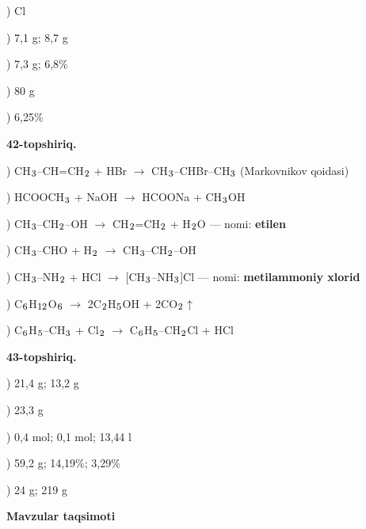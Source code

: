 \documentclass[11pt,a4paper]{article}
\renewcommand{\textsubscript}[1]{\ensuremath{_{\text{\fontsize{8}{8}\selectfont #1}}}}
\begin{document}
) Cl\par
{}) 7,1 g; 8,7 g\par
{}) 7,3 g; 6,8\%\par
{}) 80 g\par
{}) 6,25\%\par
\noindent\textbf{42-topshiriq.}\par
{}) CH\textsubscript{3}--CH=CH\textsubscript{2} + HBr $\to$ CH\textsubscript{3}--CHBr--CH\textsubscript{3} (Markovnikov qoidasi)\par
{}) HCOOCH\textsubscript{3} + NaOH $\to$ HCOONa + CH\textsubscript{3}OH\par
{}) CH\textsubscript{3}--CH\textsubscript{2}--OH $\to$ CH\textsubscript{2}=CH\textsubscript{2} + H\textsubscript{2}O --- nomi: \textbf{etilen}\par
{}) CH\textsubscript{3}--CHO + H\textsubscript{2} $\to$ CH\textsubscript{3}--CH\textsubscript{2}--OH\par
{}) CH\textsubscript{3}--NH\textsubscript{2} + HCl $\to$ [CH\textsubscript{3}--NH\textsubscript{3}]Cl --- nomi: \textbf{metilammoniy xlorid}\par
{}) C\textsubscript{6}H\textsubscript{12}O\textsubscript{6} $\to$ 2C\textsubscript{2}H\textsubscript{5}OH + 2CO\textsubscript{2}$\uparrow$\par
{}) C\textsubscript{6}H\textsubscript{5}--CH\textsubscript{3} + Cl\textsubscript{2} $\to$ C\textsubscript{6}H\textsubscript{5}--CH\textsubscript{2}Cl + HCl\par
\noindent\textbf{43-topshiriq.}\par
{}) 21,4 g; 13,2 g\par
{}) 23,3 g\par
{}) 0,4 mol; 0,1 mol; 13,44 l\par
{}) 59,2 g; 14,19\%; 3,29\%\par
{}) 24 g; 219 g\par
\par\bigskip\noindent\textbf{Mavzular taqsimoti}\par\smallskip
\end{document}
